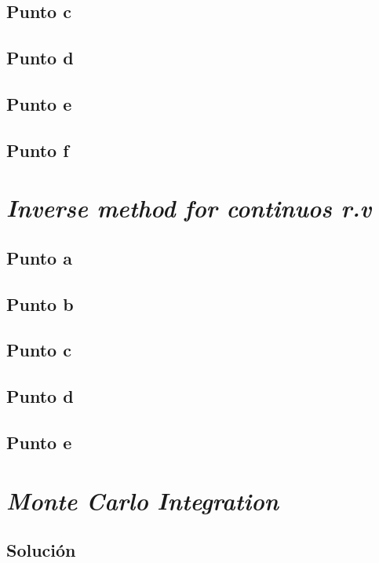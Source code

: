 \documentclass[12pt]{article}
\begin{document}
\subsection{Punto c}

\subsection{Punto d}

\subsection{Punto e}

\subsection{Punto f}


\section{\textit{Inverse method for continuos r.v}}

\subsection{Punto a}

\subsection{Punto b}

\subsection{Punto c}

\subsection{Punto d}

\subsection{Punto e}

\section{\textit{Monte Carlo Integration}}
\subsection{Solución}
\end{document}
